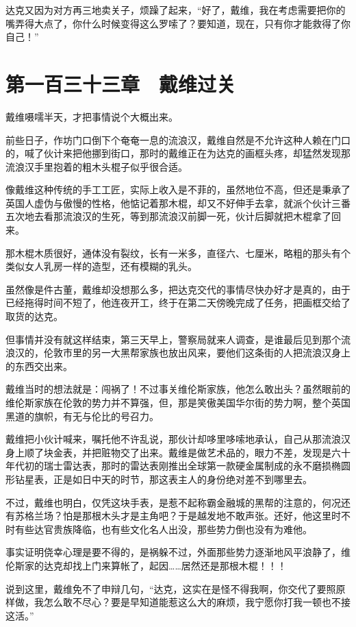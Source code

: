 达克又因为对方再三地卖关子，烦躁了起来，“好了，戴维，我在考虑需要把你的嘴弄得大点了，你什么时候变得这么罗嗦了？要知道，现在，只有你才能救得了你自己！”

\section{第一百三十三章　戴维过关}

戴维嗫嚅半天，才把事情说个大概出来。

前些日子，作坊门口倒下个奄奄一息的流浪汉，戴维自然是不允许这种人赖在门口的，喊了伙计来把他挪到街口，那时的戴维正在为达克的画框头疼，却猛然发现那流浪汉手里抱着的粗木头棍子似乎很合适。

像戴维这种传统的手工工匠，实际上收入是不菲的，虽然地位不高，但还是秉承了英国人虚伪与傲慢的性格，他惦记着那木棍，却又不好伸手去拿，就派个伙计三番五次地去看那流浪汉的生死，等到那流浪汉前脚一死，伙计后脚就把木棍拿了回来。

那木棍木质很好，通体没有裂纹，长有一米多，直径六、七厘米，略粗的那头有个类似女人乳房一样的造型，还有模糊的乳头。

虽然像是件古董，戴维却没想那么多，把达克交代的事情尽快办好才是真的，由于已经拖得时间不短了，他连夜开工，终于在第二天傍晚完成了任务，把画框交给了取货的达克。

但事情并没有就这样结束，第三天早上，警察局就来人调查，是谁最后见到那个流浪汉的，伦敦市里的另一大黑帮家族也放出风来，要他们这条街的人把流浪汉身上的东西交出来。

戴维当时的想法就是：闯祸了！不过事关维伦斯家族，他怎么敢出头？虽然眼前的维伦斯家族在伦敦的势力并不算强，但，那是笑傲美国华尔街的势力啊，整个英国黑道的旗帜，有无与伦比的号召力。

戴维把小伙计喊来，嘱托他不许乱说，那伙计却哆里哆嗦地承认，自己从那流浪汉身上顺了块金表，并把赃物交了出来。戴维是做艺术品的，眼力不差，发现是六十年代初的瑞士雷达表，那时的雷达表刚推出全球第一款硬金属制成的永不磨损椭圆形钻星表，正是如日中天的时节，那这表主人的身份绝对差不到哪里去。

不过，戴维也明白，仅凭这块手表，是惹不起称霸金融城的黑帮的注意的，何况还有苏格兰场？怕是那根木头才是主角吧？于是越发地不敢声张。还好，他这里时不时有些达官贵族降临，也有些文化名人出没，那些势力倒也没有为难他。

事实证明侥幸心理是要不得的，是祸躲不过，外面那些势力逐渐地风平浪静了，维伦斯家的达克却找上门来算帐了，起因……居然还是那根木棍！！！

说到这里，戴维免不了申辩几句，“达克，这实在是怪不得我啊，你交代了要照原样做，我怎么敢不尽心？要是早知道能惹这么大的麻烦，我宁愿你打我一顿也不接这活。”

